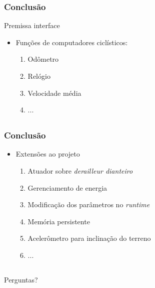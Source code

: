 \documentclass{beamer}
\begin{document}
\begin{frame}
  \frametitle{Conclusão}
Premissa interface
  \begin{itemize}
   \item Funções de computadores ciclísticos:
    \begin{enumerate}
      \item Odômetro
      \item Relógio
      \item Velocidade média
      \item ...
    \end{enumerate}
  \end{itemize}
\end{frame}

\subsection{}
\begin{frame}
  \frametitle{Conclusão}
\begin{itemize}
 \item Extensões ao projeto
  \begin{enumerate}
   \item Atuador sobre \textit{derailleur dianteiro}
    \item Gerenciamento de energia
    \item Modificação dos parâmetros no \textit{runtime}
    \item Memória persistente
    \item Acelerômetro para inclinação do terreno
    \item ...
  \end{enumerate}

\end{itemize}

\end{frame}



\subsection{}
\begin{frame}

\vfil
\begin{center}
 \Large Perguntas?
\end{center}


\end{frame}
\end{document}
